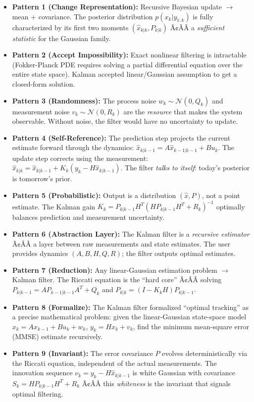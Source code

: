 \begin{itemize}
\item \textbf{Pattern 1 (Change Representation):} Recursive Bayesian update $\to$ mean + covariance. The posterior distribution $p(x_k | y_{1:k})$ is fully characterized by its first two moments $(\hat{x}_{k|k}, P_{k|k})$ Ã¢ÂÂ a \emph{sufficient statistic} for the Gaussian family.

\item \textbf{Pattern 2 (Accept Impossibility):} Exact nonlinear filtering is intractable (Fokker-Planck PDE requires solving a partial differential equation over the entire state space). Kalman accepted linear/Gaussian assumption to get a closed-form solution.

\item \textbf{Pattern 3 (Randomness):} The process noise $w_k \sim \mathcal{N}(0, Q_k)$ and measurement noise $v_k \sim \mathcal{N}(0, R_k)$ are the \emph{resource} that makes the system observable. Without noise, the filter would have no uncertainty to update.

\item \textbf{Pattern 4 (Self-Reference):} The prediction step projects the current estimate forward through the dynamics: $\hat{x}_{k|k-1} = A\hat{x}_{k-1|k-1} + Bu_k$. The update step corrects using the measurement: $\hat{x}_{k|k} = \hat{x}_{k|k-1} + K_k(y_k - H\hat{x}_{k|k-1})$. The filter \emph{talks to itself}: today's posterior is tomorrow's prior.

\item \textbf{Pattern 5 (Probabilistic):} Output is a distribution $(\hat{x}, P)$, not a point estimate. The Kalman gain $K_k = P_{k|k-1}H^T(H P_{k|k-1}H^T + R_k)^{-1}$ optimally balances prediction and measurement uncertainty.

\item \textbf{Pattern 6 (Abstraction Layer):} The Kalman filter is a \emph{recursive estimator} Ã¢ÂÂ a layer between raw measurements and state estimates. The user provides dynamics $(A, B, H, Q, R)$; the filter outputs optimal estimates.

\item \textbf{Pattern 7 (Reduction):} Any linear-Gaussian estimation problem $\to$ Kalman filter. The Riccati equation is the ``hard core'' Ã¢ÂÂ solving $P_{k|k-1} = AP_{k-1|k-1}A^T + Q_k$ and $P_{k|k} = (I - K_kH)P_{k|k-1}$.

\item \textbf{Pattern 8 (Formalize):} The Kalman filter formalized ``optimal tracking'' as a precise mathematical problem: given the linear-Gaussian state-space model $x_k = Ax_{k-1} + Bu_k + w_k$, $y_k = Hx_k + v_k$, find the minimum mean-square error (MMSE) estimate recursively.

\item \textbf{Pattern 9 (Invariant):} The error covariance $P$ evolves deterministically via the Riccati equation, independent of the actual measurements. The innovation sequence $\nu_k = y_k - H\hat{x}_{k|k-1}$ is white Gaussian with covariance $S_k = HP_{k|k-1}H^T + R_k$ Ã¢ÂÂ this \emph{whiteness} is the invariant that signals optimal filtering.
\end{itemize}

